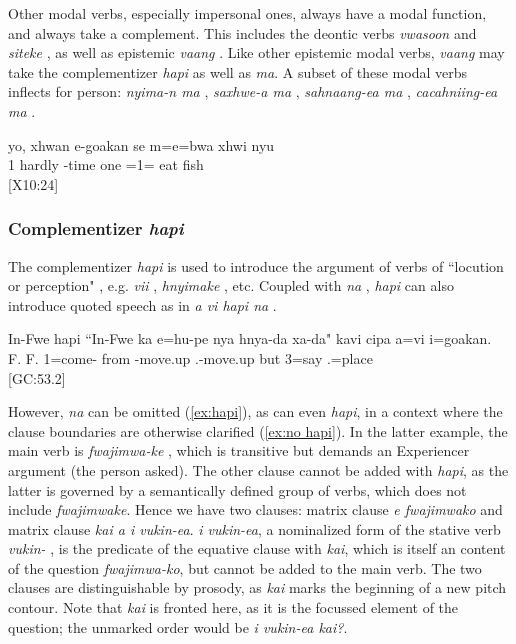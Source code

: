 Other modal verbs, especially impersonal ones, always have a modal function, and always take a complement. This includes the deontic verbs \textit{vwasoon}  and \textit{siteke} , as well as epistemic \textit{vaang} . Like other epistemic modal verbs, \textit{vaang} may take the complementizer \textit{hapi} as well as \textit{ma}.
A subset of these modal verbs inflects for person: \textit{nyima-n ma} , \textit{saxhwe-a ma} , \textit{sahnaang-ea ma} , \textit{cacahniing-ea ma} .

\ea \label{ex:xhwan e-goakan}\gll yo, xhwan e-goakan se m=e=bwa xhwi nyu\\
 1 hardly -time one =1= eat fish\\
\glt {} {[X10:24]}
\z

\subsubsection{Complementizer \textit{hapi}}
\label{ssec:hapi}
The complementizer \textit{hapi} is used to introduce the argument of verbs of ``locution or perception" \parencite[53]{lynch_oceanic_2002}, e.g. \textit{vii} , \textit{hnyimake} , etc. Coupled with \textit{na} , \textit{hapi} can also introduce quoted speech as in \textit{a vi hapi na} . 

\ea\label{ex:hapi}\gll In-Fwe hapi ``In-Fwe ka e=hu-pe nya hnya-da xa-da" kavi cipa a=vi i=goakan.\\
 F.  F.  1=come- from -move.up .-move.up but  3=say .=place\\
\glt {} {[GC:53.2]}
\z

However, \textit{na} can be omitted (\ref{ex:hapi}), as can even \textit{hapi}, in a context where the clause boundaries are otherwise clarified (\ref{ex:no hapi}). In the latter example, the main verb is \textit{fwajimwa-ke} , which is transitive but demands an Experiencer argument (the person asked). The other clause cannot be added with \textit{hapi}, as the latter is governed by a semantically defined group of verbs, which does not include \textit{fwajimwake}. Hence we have two clauses: matrix clause \textit{e fwajimwako} and matrix clause \textit{kai a i vukin-ea}. \textit{i vukin-ea}, a nominalized form of the stative verb \textit{vukin-} , is the predicate of the equative clause with \textit{kai}, which is itself an content of the question \textit{fwajimwa-ko}, but cannot be added to the main verb. The two clauses are distinguishable by prosody, as \textit{kai} marks the beginning of a new pitch contour. Note that \textit{kai} is fronted here, as it is the focussed element of the question; the unmarked order would be \textit{i vukin-ea kai?}.

